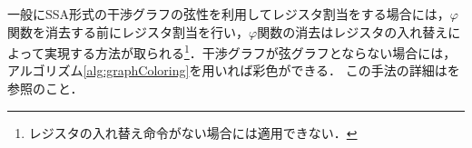 \documentclass[dvipdfmx,a4j]{jbook}
\begin{document}
一般にSSA形式の干渉グラフの弦性を利用してレジスタ割当をする場合には，$\varphi$関数を消去する前にレジスタ割当を行い，$\varphi$関数の消去はレジスタの入れ替えによって実現する方法が取られる\footnote{レジスタの入れ替え命令がない場合には適用できない．}．干渉グラフが弦グラフとならない場合には，アルゴリズム\ref{alg:graphColoring}を用いれば彩色ができる．
この手法の詳細は\cite{DBLP:conf/cc/HackGG06}を参照のこと．

\end{document}
